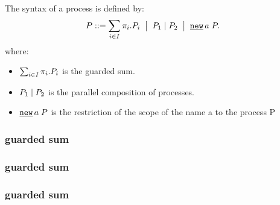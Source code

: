 \begin{definition}[Syntax]
\label{def_syntax}
The syntax of a \picalc{} process  is defined by: 
\begin{align*}
 P & \syntdef \procsum \ebnf \procpar{P_1}{P_2} \ebnf \procres{a}{P}.
\end{align*}
where:
\begin{itemize}
\item $\sum_{i\in I}{\pi_i.P_i}$ is the guarded sum.
\item $P_1 \mid P_2$ is the parallel composition of processes.
\item $\procres{a}{P}$ is the restriction of the scope of the name a to the process P
\end{itemize}
\end{definition}

\subsubsection{guarded sum}
\subsubsection{guarded sum}
\subsubsection{guarded sum}





